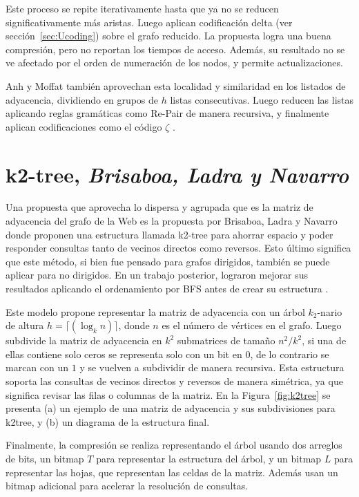 

Este proceso se repite iterativamente hasta que ya no se reducen significativamente más aristas. Luego aplican codificación delta (ver sección~\ref{sec:Ucoding}) sobre el grafo reducido. La propuesta logra una buena compresión, pero no reportan los tiempos de acceso. Además, su resultado no se ve afectado por el orden de numeración de los nodos, y permite actualizaciones.

Anh y Moffat \cite{anh2010local} también aprovechan esta localidad y similaridad en los listados de adyacencia, dividiendo en grupos de $h$ listas consecutivas. Luego reducen las listas aplicando reglas gramáticas como Re-Pair \cite{larsson2000off} de manera recursiva, y finalmente aplican codificaciones como el código $\zeta$ \cite{boldi2005codes}.


\section{k2-tree, \textit{Brisaboa, Ladra y Navarro}}
Una propuesta que aprovecha lo dispersa y agrupada que es la matriz de adyacencia del grafo de la Web es la propuesta por Brisaboa, Ladra y Navarro \cite{brisaboa2009k} donde proponen una estructura llamada k2-tree para ahorrar espacio y poder responder consultas tanto de vecinos directos como reversos. Esto último significa que este método, si bien fue pensado para grafos dirigidos, también se puede aplicar para no dirigidos. En un trabajo posterior, lograron mejorar sus resultados aplicando el ordenamiento por BFS antes de crear su estructura \cite{brisaboa2014compact}.

Este modelo propone representar la matriz de adyacencia con un árbol $k_{2}$-nario de altura $h=\lceil(\log_k n)\rceil$, donde $n$ es el número de vértices en el grafo. Luego subdivide la matriz de adyacencia en $k^2$ submatrices de tamaño $n^{2}/k^{2}$, si una de ellas contiene solo ceros se representa solo con un bit en $0$, de lo contrario se marcan con un $1$ y se vuelven a subdividir de manera recursiva. Esta estructura soporta las consultas de vecinos directos y reversos de manera simétrica, ya que significa revisar las filas o columnas de la matriz. En la Figura~\ref{fig:k2tree} se presenta (a) un ejemplo de una matriz de adyacencia y sus subdivisiones para k2tree, y (b) un diagrama de la estructura final.



Finalmente, la compresión se realiza representando el árbol usando dos arreglos de bits, un bitmap $T$ para representar la estructura del árbol, y un bitmap $L$ para representar las hojas, que representan las celdas de la matriz. Además usan un bitmap adicional para acelerar la resolución de consultas. 

